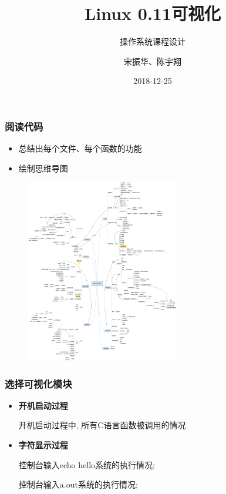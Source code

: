 \documentclass[14pt,UTF-8]{beamer}
\begin{document}
	\author{宋振华、陈宇翔}
	\title{Linux 0.11可视化}
	\subtitle{操作系统课程设计}
	\date{2018-12-25}
	\begin{frame}[plain]
	\maketitle
\end{frame}

\begin{frame}
\frametitle{阅读代码}
\begin{itemize}
	\item 总结出每个文件、每个函数的功能
	\item 绘制思维导图
\end{itemize}
\begin{figure}
	\centering
	\includegraphics[width=0.6\textwidth,natwidth=2722 ,natheight=3249]{img/linux0.11.pdf}
	\label{fig:linuxgraph}
\end{figure}
\end{frame}

\begin{frame}
\frametitle{选择可视化模块}
\begin{itemize}
	\item \textbf{开机启动过程}
	
	开机启动过程中, 所有C语言函数被调用的情况
	\item \textbf{字符显示过程}
	
	控制台输入echo hello系统的执行情况;
	
	控制台输入a.out系统的执行情况;
\end{itemize}
\end{frame}
\end{document}
